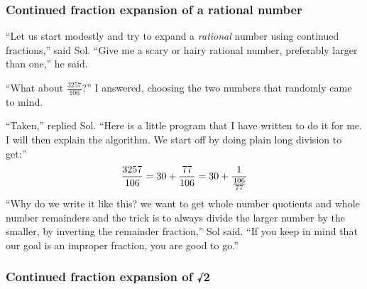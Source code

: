 \documentclass[
  a4paper,
]{article}
\begin{document}
\subsubsection{Continued fraction expansion of a rational
number}\label{continued-fraction-expansion-of-a-rational-number}

``Let us start modestly and try to expand a \emph{rational} number using
continued fractions,'' said Sol. ``Give me a scary or hairy rational
number, preferably larger than one,'' he said.

``What about \(\frac{3257}{106}\)?'' I answered, choosing the two
numbers that randomly came to mind.

``Taken,'' replied Sol. ``Here is a little program that I have written
to do it for me. I will then explain the algorithm. We start off by
doing plain long division to get:'' \[
\frac{3257}{106} = 30 + \frac{77}{106} = 30 + \frac{1}{\frac{106}{77}}\\
\] ``Why do we write it like this? we want to get whole number quotients
and whole number remainders and the trick is to always divide the larger
number by the smaller, by inverting the remainder fraction,'' Sol said.
``If you keep in mind that our goal is an improper fraction, you are
good to go.''

\subsubsection{Continued fraction expansion of
√2}\label{continued-fraction-expansion-of-2}
\end{document}
